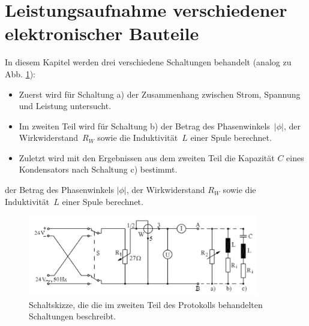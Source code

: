 \section[Leistungsaufnahme]{Leistungsaufnahme verschiedener elektronischer Bauteile}
In diesem Kapitel werden  drei verschiedene Schaltungen behandelt (analog zu Abb. \ref{fig:Leistungsaufnahme}):
\begin{itemize}
	\item Zuerst wird für Schaltung a) der Zusammenhang zwischen Strom, Spannung und Leistung untersucht.
	\item Im zweiten Teil wird für Schaltung b) der Betrag des Phasenwinkels~$|\phi|$, der Wirkwiderstand~$R_W$ sowie die Induktivität~$L$ einer Spule	 berechnet.
	\item Zuletzt wird mit den Ergebnissen aus dem zweiten Teil die Kapazität $C$ eines Kondensators nach Schaltung c) bestimmt.
\end{itemize}

der Betrag des Phasenwinkels $|\phi|$, der Wirkwiderstand $R_W$ sowie die Induktivität~$L$ einer Spule berechnet.
\begin{figure}[h]
	\centering
	\includegraphics[width=0.9\textwidth]{res/Schaltskizze.png}
	\caption{Schaltskizze, die die im zweiten Teil des Protokolls behandelten Schaltungen beschreibt.\cite{lw}}
	\label{fig:Leistungsaufnahme}
\end{figure}

